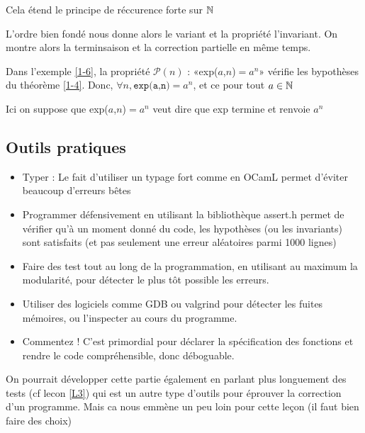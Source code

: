 \begin{rem}
	Cela étend le principe de réccurence forte sur $\mathbb{N}$
\end{rem}

L'ordre bien fondé nous donne alors le variant et la propriété l'invariant. On montre alors la terminsaison et la correction partielle en même temps.

\begin{example}
	Dans l'exemple \ref{1-6}, la propriété $\mathcal P(n)$ : «exp($a$,$n$)$ = a^n$» vérifie les bypothèses du théorème \ref{1-4}. Donc, $\forall n, \texttt{exp(a,n)} = a^n$, et ce pour tout $a\in \mathbb{N}$
\end{example}

\begin{com}
	Ici on suppose que exp($a$,$n$)$ = a^n$ veut dire que exp termine et renvoie $a^n$
\end{com}

\subsection{Outils pratiques}

\begin{itemize}[label=$\star$]
	\item Typer : Le fait d'utiliser un typage fort comme en OCamL permet d'éviter beaucoup d'erreurs bêtes
	\item Programmer défensivement en utilisant la bibliothèque assert.h permet de vérifier qu'à un moment donné du code, les hypothèses (ou les invariants) sont satisfaits (et pas seulement une erreur aléatoires parmi 1000 lignes)
	\item Faire des test tout au long de la programmation, en utilisant au maximum la modularité, pour détecter le plus tôt possible les erreurs.
	\item Utiliser des logiciels comme GDB ou valgrind pour détecter les fuites mémoires, ou l'inspecter au cours du programme.
	\item Commentez ! C'est primordial pour déclarer la spécification des fonctions et rendre le code compréhensible, donc déboguable.
\end{itemize}


\begin{com}
	On pourrait développer cette partie également en parlant plus longuement des tests (cf lecon \ref{L3}) qui est un autre type d'outils pour éprouver la correction d'un programme. Mais ca nous emmène un peu loin pour cette leçon (il faut bien faire des choix)
\end{com}
